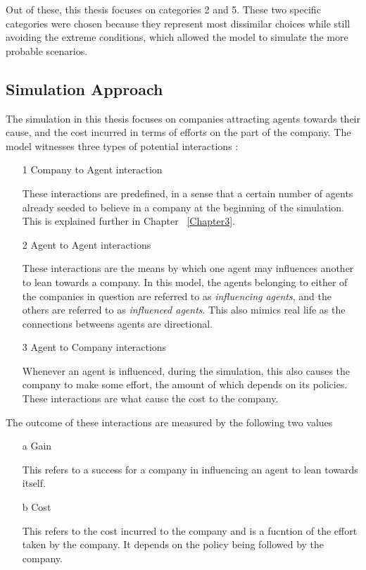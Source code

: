 Out of these, this thesis focuses on categories 2 and 5.
These two specific categories were chosen because they represent most dissimilar choices while still avoiding the extreme conditions, which allowed the model to simulate the more probable scenarios.

\subsection{Simulation Approach}

The simulation in this thesis focuses on companies attracting agents towards their cause, and the cost incurred in terms of efforts on the part of the company.
The model witnesses three types of potential interactions : 
\begin{enumerate}
\item[1] Company to Agent interaction 

These interactions are predefined, in a sense that a certain number of agents already seeded to believe in a company at the beginning of the simulation. This is explained further in Chapter ~\ref{Chapter3}.

\item[2] Agent to Agent interactions

These interactions are the means by which one agent may influences another to lean towards a company. In this model, the agents belonging to either of the companies in question are referred to as  \emph{influencing agents}, and the others are referred to as \emph{influenced agents}. This also mimics real life as the connections betweens agents are directional.

\item[3] Agent to Company interactions

Whenever an agent is influenced, during the simulation, this also causes the company to make some effort, the amount of which depends on its policies. These interactions are what cause the cost to the company.


\end{enumerate}

The outcome of these interactions are measured by the following two values

\begin{enumerate}
\item[a] Gain

This refers to a success for a company in influencing an agent to lean towards itself.

\item[b] Cost

This refers to the cost incurred to the company and is a fucntion of the effort taken by the company. It depends on the policy being followed by the company.
\end{enumerate}
	





